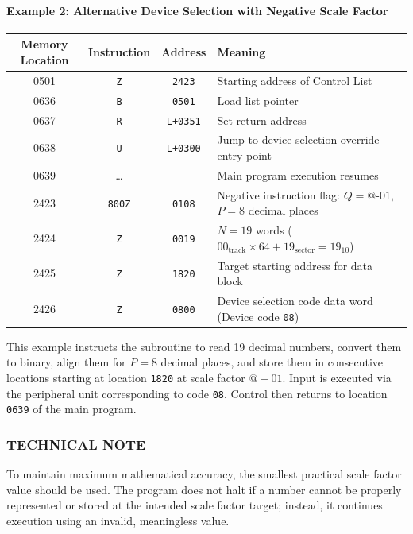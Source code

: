 \paragraph{Example 2: Alternative Device Selection with Negative Scale Factor}
\begin{table}[h!]
\centering
\begin{tabularx}{\textwidth}{cccX}
\toprule
\textbf{Memory Location} & \textbf{Instruction} & \textbf{Address} & \textbf{Meaning} \\
\midrule
    0501              & \texttt{Z}      & \texttt{2423}    & Starting address of Control List \\
    0636              & \texttt{B}      & \texttt{0501}    & Load list pointer \\
    0637              & \texttt{R}      & \texttt{L+0351}  & Set return address \\
    0638              & \texttt{U}      & \texttt{L+0300}  & Jump to device-selection override entry point \\
    0639              & \dots           &                  & Main program execution resumes \\
    \midrule
    2423              & \texttt{800Z}   & \texttt{0108}    & Negative instruction flag: $Q = \text{@-01}$, $P = 8$ decimal places \\
    2424              & \texttt{Z}      & \texttt{0019}    & $N = 19$ words ($00_{\text{track}} \times 64 + 19_{\text{sector}} = 19_{10}$) \\
    2425              & \texttt{Z}      & \texttt{1820}    & Target starting address for data block \\
2426              & \texttt{Z}      & \texttt{0800}    & Device selection code data word (Device code \texttt{08}) \\
\bottomrule
\end{tabularx}
\end{table}
This example instructs the subroutine to read 19 decimal numbers, convert them to binary, align them for $P=8$ decimal places, and store them in consecutive locations starting at location \texttt{1820} at scale factor $@-01$. Input is executed via the peripheral unit corresponding to code \texttt{08}. Control then returns to location \texttt{0639} of the main program.

\subsubsection*{TECHNICAL NOTE}
To maintain maximum mathematical accuracy, the smallest practical scale factor value should be used. The program does not halt if a number cannot be properly represented or stored at the intended scale factor target; instead, it continues execution using an invalid, meaningless value.
\newpage
